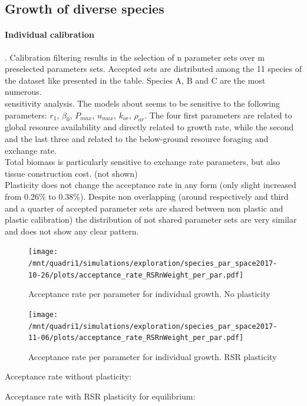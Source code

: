 \documentclass[review]{elsarticle}
\begin{document}
\subsection{Growth of diverse species}
\paragraph{Individual calibration}. Calibration filtering results in the selection of n parameter sets over m preselected parameters sets. Accepted sets are distributed among the 11 species of the dataset like presented in the table. Species A, B and C are the most numerous.\\
sensitivity analysis. The models about seems to be sensitive to the following parameters: $r_1$, $\beta_0$, $P_{max}$, $u_{max}$, $k_{or}$, $\rho_{ar}$. The four first parameters are related to global resource availability and directly related to growth rate, while the second and the last three and related to the below-ground resource foraging and exchange rate.\\
Total biomass is particularly sensitive to exchange rate parameters, but also tissue construction cost. (not shown)\\

Plasticity does not change the acceptance rate in any form (only slight increased from 0.26\% to 0.38\%). Despite non overlapping (around respectively and third and a quarter of accepted parameter sets are shared between non plastic and plastic calibration) the distribution of not shared parameter sets are very similar and does not show any clear pattern. \\

\begin{figure}
\texttt{[image: /mnt/quadri1/simulations/exploration/species\_par\_space2017-10-26/plots/acceptance\_rate\_RSRnWeight\_per\_par.pdf]}
\caption{Acceptance rate per parameter for individual growth. No plasticity}
\end{figure}

\begin{figure}
\texttt{[image: /mnt/quadri1/simulations/exploration/species\_par\_space2017-11-06/plots/acceptance\_rate\_RSRnWeight\_per\_par.pdf]}
\caption{Acceptance rate per parameter for individual growth. RSR plasticity}
\end{figure}

Acceptance rate without plasticity:

Acceptance rate with RSR plasticity for equilibrium:

\end{document}
